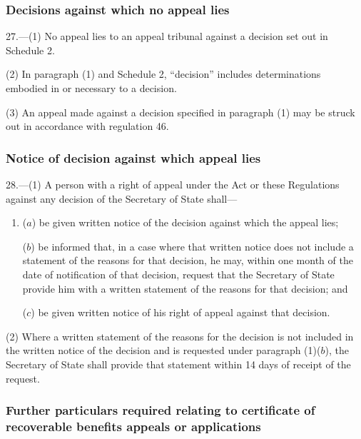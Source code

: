 \documentclass[12pt,a4paper]{article}
\begin{document}
\subsubsection[27. Decisions against which no appeal lies]{Decisions against which no appeal lies}

27.—(1) No appeal lies to an appeal tribunal against a decision set out in Schedule 2.

(2) In paragraph (1) and Schedule 2, “decision” includes determinations embodied in or necessary to a decision.

(3) An appeal made against a decision specified in paragraph (1) may be struck out in accordance with regulation 46.

\subsubsection[28. Notice of decision against which appeal lies]{Notice of decision against which appeal lies}

28.—(1) A person with a right of appeal under the Act or these Regulations against any decision of the Secretary of State shall—
\begin{enumerate}\item[]
($a$) be given written notice of the decision against which the appeal lies;

($b$) be informed that, in a case where that written notice does not include a statement of the reasons for that decision, he may, within one month of the date of notification of that decision, request that the Secretary of State provide him with a written statement of the reasons for that decision; and

($c$) be given written notice of his right of appeal against that decision.
\end{enumerate}

(2) Where a written statement of the reasons for the decision is not included in the written notice of the decision and is requested under paragraph (1)($b$), the Secretary of State shall provide that statement within 14 days of receipt of the request.

\subsubsection[29. Further particulars required relating to certificate of recoverable benefits appeals or applications]{Further particulars required relating to certificate of recoverable benefits appeals or applications}
\end{document}
